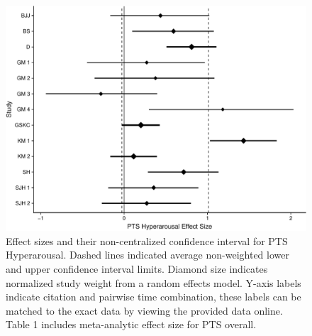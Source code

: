 \documentclass[man]{apa6}
\theoremstyle{definition}
\theoremstyle{definition}
\theoremstyle{definition}
\theoremstyle{remark}
\begin{document}
\begin{figure}[htbp]
\centering
\includegraphics{meta_markdown_files/figure-latex/ptspichyper-1.pdf}
\caption{\label{fig:ptspichyper}Effect sizes and their non-centralized
confidence interval for PTS Hyperarousal. Dashed lines indicated average
non-weighted lower and upper confidence interval limits. Diamond size
indicates normalized study weight from a random effects model. Y-axis
labels indicate citation and pairwise time combination, these labels can
be matched to the exact data by viewing the provided data online. Table
1 includes meta-analytic effect size for PTS overall.}
\end{figure}
\end{document}
